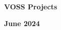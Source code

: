 \documentclass[12pt]{article}
\begin{document}
\begin{titlepage}

    \centering
    {\huge\bfseries VOSS Projects\par}
    \Large
    \vspace*{0.17in}
    \vspace*{0.17in}
    \vspace*{0.1in}
    \Large
    \begin{figure}[h]
      \centering
    \end{figure}  

    \textbf{June 2024}
\end{titlepage}




\tableofcontents
\clearpage
\listoffigures
\clearpage
\end{document}
